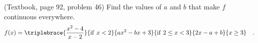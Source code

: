 (Textbook, page 92, problem 46)
Find the values of $a$ and $b$ that make $f$ continuous everywhere.
\[f(x)=\triplebrace{\frac{x^2-4}{x-2}}{\mathrm{if~}x<2}{ax^2-bx+3}{\mathrm{if~}2\leq x<3}{2x-a+b}{x\geq 3} \quad .\]
